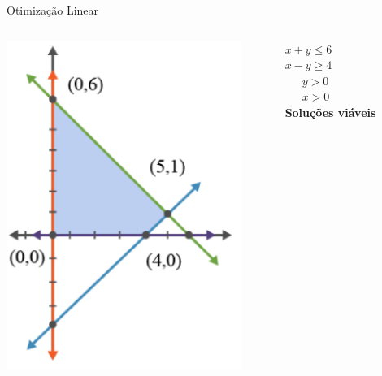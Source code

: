 \documentclass[compress]{beamer}
\begin{document}
\begin{frame}{Otimização Linear}

\begin{columns}[T]
    \begin{column}{.58\textwidth}
        \centering \includegraphics[width=0.9\textwidth]{images/modelo_pl.png}
    \end{column}
    \begin{column}{.4\textwidth}
        \vspace{1.8cm}
        \textcolor{mygreen}{$x + y \leq 6$} \\
        \vspace{0.25cm}
        \textcolor{myblue}{$x - y \geq 4$} \\
        \vspace{0.25cm}
        \quad~~~\textcolor{myred}{$y > 0$} \\
        \vspace{0.25cm}
        \quad~~~\textcolor{mypurple}{$x > 0$} \\
        \vspace{0.25cm}
        \textcolor{solviaveis}{\textbf{Soluções viáveis}}
    \end{column}
\end{columns}

\end{frame}
\end{document}
